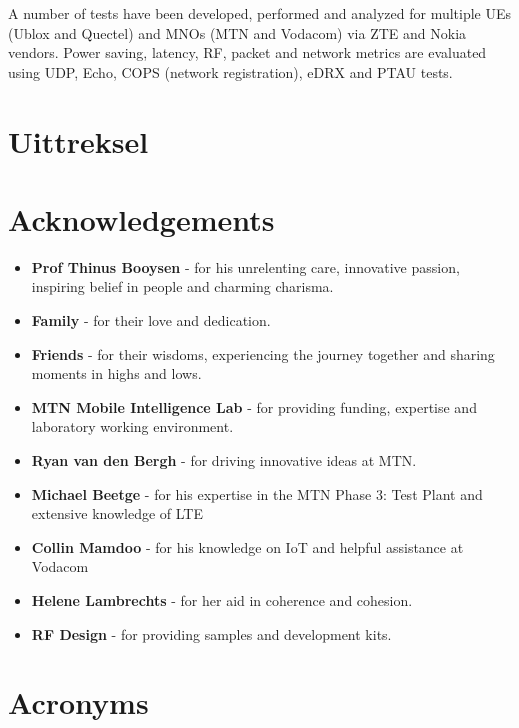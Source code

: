 \documentclass[]{article}
\providecommand{\tightlist}{%
  \setlength{\itemsep}{0pt}\setlength{\parskip}{0pt}}
\begin{document}
A number of tests have been developed, performed and analyzed for
multiple UEs (Ublox and Quectel) and MNOs (MTN and Vodacom) via ZTE and
Nokia vendors. Power saving, latency, RF, packet and network metrics are
evaluated using UDP, Echo, COPS (network registration), eDRX and PTAU
tests.

\hypertarget{uittreksel}{%
\section*{Uittreksel}\label{uittreksel}}

\hypertarget{acknowledgements}{%
\section*{Acknowledgements}\label{acknowledgements}}

\begin{itemize}
\tightlist
\item
  \textbf{Prof Thinus Booysen} - for his unrelenting care, innovative
  passion, inspiring belief in people and charming charisma.
\item
  \textbf{Family} - for their love and dedication.
\item
  \textbf{Friends} - for their wisdoms, experiencing the journey
  together and sharing moments in highs and lows.
\item
  \textbf{MTN Mobile Intelligence Lab} - for providing funding,
  expertise and laboratory working environment.
\item
  \textbf{Ryan van den Bergh} - for driving innovative ideas at MTN.
\item
  \textbf{Michael Beetge} - for his expertise in the MTN Phase 3: Test
  Plant and extensive knowledge of LTE
\item
  \textbf{Collin Mamdoo} - for his knowledge on IoT and helpful
  assistance at Vodacom
\item
  \textbf{Helene Lambrechts} - for her aid in coherence and cohesion.
\item
  \textbf{RF Design} - for providing samples and development kits.
\end{itemize}

\hypertarget{acronyms}{%
\section*{Acronyms}\label{acronyms}}
\end{document}
